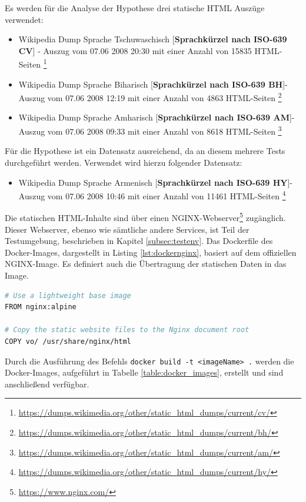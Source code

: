 Es werden für die Analyse der Hypothese \textit{} drei statische HTML Auszüge verwendet:
\begin{itemize}
    \item Wikipedia Dump Sprache Tschuwaschisch [\textbf{Sprachkürzel nach ISO-639 CV}] \newline- Auszug vom 07.06 2008 20:30 mit einer Anzahl von 15835 HTML-Seiten \footnote{\url{https://dumps.wikimedia.org/other/static_html_dumps/current/cv/}}
    \item Wikipedia Dump Sprache Biharisch [\textbf{Sprachkürzel nach ISO-639 BH}]\newline- Auszug vom 07.06 2008 12:19 mit einer Anzahl von 4863 HTML-Seiten \footnote{\url{https://dumps.wikimedia.org/other/static_html_dumps/current/bh/}}
 \item Wikipedia Dump Sprache Amharisch [\textbf{Sprachkürzel nach ISO-639 AM}]\newline- Auszug vom 07.06 2008 09:33 mit einer Anzahl von 8618 HTML-Seiten \footnote{\url{https://dumps.wikimedia.org/other/static_html_dumps/current/am/}}
\end{itemize}

Für die Hypothese \textit{} ist ein Datensatz ausreichend, da an diesem mehrere Tests durchgeführt werden. Verwendet wird hierzu folgender Datensatz:
\begin{itemize}
        \item Wikipedia Dump Sprache Armenisch [\textbf{Sprachkürzel nach ISO-639 HY}]\newline- Auszug vom 07.06 2008 10:46 mit einer Anzahl von 11461 HTML-Seiten \footnote{\url{https://dumps.wikimedia.org/other/static_html_dumps/current/hy/}}
\end{itemize}

Die statischen HTML-Inhalte sind über einen NGINX-Webserver\footnote{\url{https://www.nginx.com/}} zugänglich. Dieser Webserver, ebenso wie sämtliche andere Services, ist Teil der Testumgebung, beschrieben in Kapitel \ref{subsec:testenv}. Das Dockerfile des Docker-Images, dargestellt in Listing \ref{lst:dockernginx}, basiert auf dem offiziellen NGINX-Image. Es definiert auch die Übertragung der statischen Daten in das Image.

\begin{lstlisting}[language=Bash, caption={Dockerfile zur Erstellung des NGINX-Images, versorgt mit Testdaten.},label={lst:dockernginx}]
# Use a lightweight base image
FROM nginx:alpine

# Copy the static website files to the Nginx document root
COPY vo/ /usr/share/nginx/html

\end{lstlisting}
Durch die Ausführung des Befehls \lstinline{docker build -t <imageName> .} werden die Docker-Images, aufgeführt in Tabelle \ref{table:docker_images}, erstellt und sind anschließend verfügbar.

